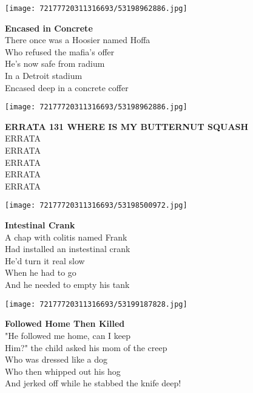 \documentclass[10pt,letterpaper]{article}
\begin{document}
\begin{center}
\texttt{[image: 72177720311316693/53198962886.jpg]}
\end{center}

\begin{center}
\textbf{Encased in Concrete}\\
\vskip 0.2in
There once was a Hoosier named Hoffa\\
Who refused the mafia's offer\\
He's now safe from radium\\
In a Detroit stadium\\
Encased deep in a concrete coffer\\
\end{center}
\pagebreak

\begin{center}
\texttt{[image: 72177720311316693/53198962886.jpg]}
\end{center}

\begin{center}
\textbf{ERRATA 131 WHERE IS MY BUTTERNUT SQUASH}\\
\vskip 0.2in
ERRATA\\
ERRATA\\
ERRATA\\
ERRATA\\
ERRATA\\
\end{center}
\pagebreak

\begin{center}\texttt{[image: 72177720311316693/53198500972.jpg]}
\end{center}
\begin{center}
\textbf{Intestinal Crank}\\
\vskip 0.2in
A chap with colitis named Frank\\
Had installed an instestinal crank\\
He'd turn it real slow\\
When he had to go\\
And he needed to empty his tank\\
\end{center}
\pagebreak

\begin{center}\texttt{[image: 72177720311316693/53199187828.jpg]}
\end{center}
\begin{center}
\textbf{Followed Home Then Killed}\\
\vskip 0.2in
"He followed me home, can I keep\\
Him?" the child asked his mom of the creep\\
Who was dressed like a dog\\
Who then whipped out his hog\\
And jerked off while he stabbed the knife deep!\\
\end{center}
\pagebreak
\end{document}
